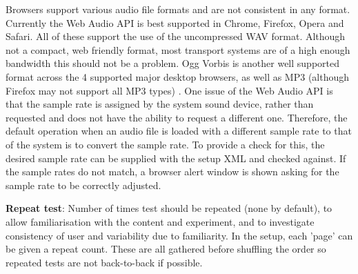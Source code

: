 \documentclass{article}
\begin{document}
Browsers support various audio file formats and are not consistent in any format. Currently the Web Audio API is best supported in Chrome, Firefox, Opera and Safari. All of these support the use of the uncompressed WAV format. Although not a compact, web friendly format, most transport systems are of a high enough bandwidth this should not be a problem. Ogg Vorbis is another well supported format across the 4 supported major desktop browsers, as well as MP3 (although Firefox may not support all MP3 types) \cite{mozdevSupportedMedia}. %
One issue of the Web Audio API is that the sample rate is assigned by the system sound device, rather than requested and does not have the ability to request a different one. %
 Therefore, the default operation when an audio file is loaded with a different sample rate to that of the system is to convert the sample rate. To provide a check for this, the desired sample rate can be supplied with the setup XML and checked against. If the sample rates do not match, a browser alert window is shown asking for the sample rate to be correctly adjusted. 
\item \textbf{Repeat test}: Number of times test should be repeated (none by default), to allow familiarisation with the content and experiment, and to investigate consistency of user and variability due to familiarity. In the setup, each 'page' can be given a repeat count. These are all gathered before shuffling the order so repeated tests are not back-to-back if possible.
\end{document}
